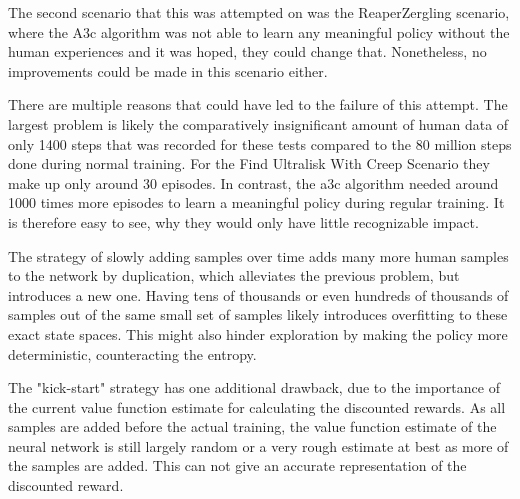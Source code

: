 The second scenario that this was attempted on was the ReaperZergling scenario, where the A3c algorithm was not able to learn any meaningful policy without the human experiences and it was hoped, they could change that. Nonetheless, no improvements could be made in this scenario either.

There are multiple reasons that could have led to the failure of this attempt. The largest problem is likely the comparatively insignificant amount of human data of only 1400 steps that was recorded for these tests compared to the 80 million steps done during normal training. For the Find Ultralisk With Creep Scenario they make up only around 30 episodes. In contrast, the a3c algorithm needed around 1000 times more episodes to learn a meaningful policy during regular training. It is therefore easy to see, why they would only have little recognizable impact.

The strategy of slowly adding samples over time adds many more human samples to the network by duplication, which alleviates the previous problem, but introduces a new one. Having tens of thousands or even hundreds of thousands of samples out of the same small set of samples likely introduces overfitting to these exact state spaces. This might also hinder exploration by making the policy more deterministic, counteracting the entropy.

The "kick-start" strategy has one additional drawback, due to the importance of the current value function estimate for calculating the discounted rewards. As all samples are added before the actual training, the value function estimate of the neural network is still largely random or a very rough estimate at best as more of the samples are added. This can not give an accurate representation of the discounted reward.





